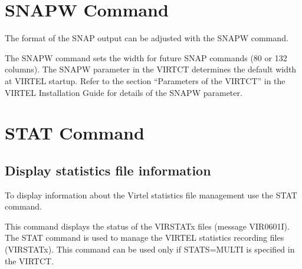 \documentclass[letterpaper,10pt,english]{sphinxmanual}
\begin{document}
\ignorespaces 

\section{SNAPW Command}
\label{\detokenize{audit_operations_ and_performance:snapw-command}}\label{\detokenize{audit_operations_ and_performance:index-22}}
The format of the SNAP output can be adjusted with the SNAPW command.

\begin{sphinxVerbatim}[commandchars=\\\{\}]
  
\end{sphinxVerbatim}

The SNAPW command sets the width for future SNAP commands (80 or 132 columns). The SNAPW parameter in the VIRTCT determines the default width at VIRTEL startup. Refer to the section “Parameters of the VIRTCT” in the VIRTEL Installation Guide for details of the SNAPW parameter.

\ignorespaces 

\section{STAT Command}
\label{\detokenize{audit_operations_ and_performance:stat-command}}\label{\detokenize{audit_operations_ and_performance:index-23}}

\subsection{Display statistics file information}
\label{\detokenize{audit_operations_ and_performance:display-statistics-file-information}}
To display information about the Virtel statistics file management use the STAT command.

\begin{sphinxVerbatim}[commandchars=\\\{\}]
\end{sphinxVerbatim}

This command displays the status of the VIRSTATx files (message VIR0601I). The STAT command is used to manage the VIRTEL statistics recording files (VIRSTATx). This command can be used only if STATS=MULTI is specified in the VIRTCT.
\end{document}
